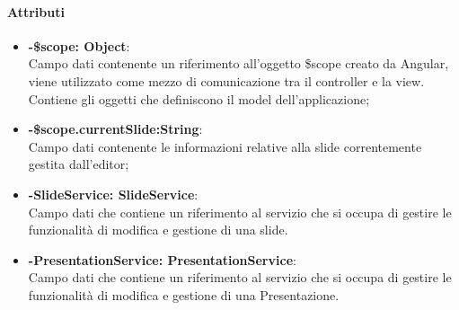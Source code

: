 	\paragraph{Attributi}
	\begin{itemize}
		\item \textbf{-\$scope: Object}:\\
			Campo dati contenente un riferimento all'oggetto \$scope creato da Angular, viene utilizzato come mezzo di comunicazione tra il controller e la view. Contiene gli oggetti che definiscono il model dell'applicazione;
		\item \textbf{-\$scope.currentSlide:String}:\\
			Campo dati contenente le informazioni relative alla slide correntemente gestita dall'editor;
		\item \textbf{-SlideService: SlideService}:\\
			Campo dati che contiene un riferimento al servizio che si occupa di gestire le funzionalità di modifica e gestione di una slide.
		\item \textbf{-PresentationService: PresentationService}:\\
			Campo dati che contiene un riferimento al servizio che si occupa di gestire le funzionalità di modifica e gestione di una Presentazione.
	\end{itemize}
	
